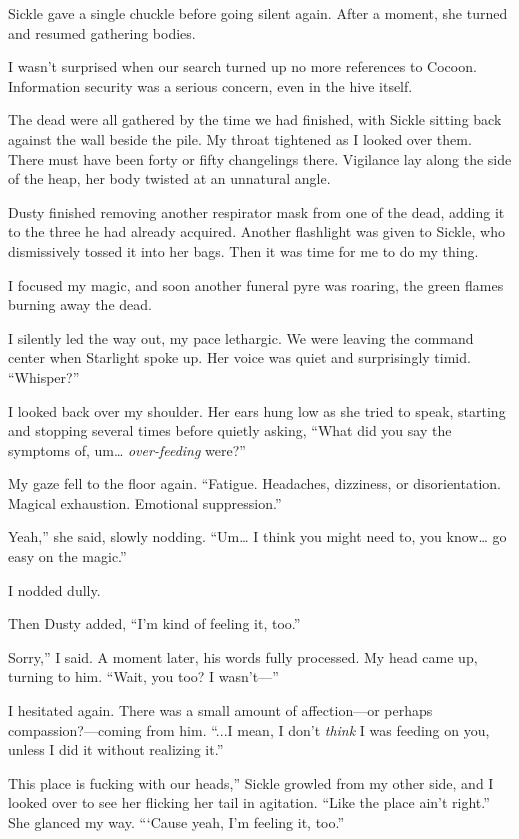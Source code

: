 Sickle gave a single chuckle before going silent again. After a moment, she turned and resumed gathering bodies.

I wasn’t surprised when our search turned up no more references to Cocoon. Information security was a serious concern, even in the hive itself.

The dead were all gathered by the time we had finished, with Sickle sitting back against the wall beside the pile. My throat tightened as I looked over them. There must have been forty or fifty changelings there. Vigilance lay along the side of the heap, her body twisted at an unnatural angle.

Dusty finished removing another respirator mask from one of the dead, adding it to the three he had already acquired. Another flashlight was given to Sickle, who dismissively tossed it into her bags. Then it was time for me to do my thing.

I focused my magic, and soon another funeral pyre was roaring, the green flames burning away the dead.

I silently led the way out, my pace lethargic. We were leaving the command center when Starlight spoke up. Her voice was quiet and surprisingly timid. “Whisper?”

I looked back over my shoulder. Her ears hung low as she tried to speak, starting and stopping several times before quietly asking, “What did you say the symptoms of, um… \textit{over-feeding} were?”

My gaze fell to the floor again. “Fatigue. Headaches, dizziness, or disorientation. Magical exhaustion. Emotional suppression.”

\leavevmode{}Yeah,” she said, slowly nodding. “Um… I think you might need to, you know… go easy on the magic.”

I nodded dully.

Then Dusty added, “I’m kind of feeling it, too.”

\leavevmode{}Sorry,” I said. A moment later, his words fully processed. My head came up, turning to him. “Wait, you too? I wasn’t—”

I hesitated again. There was a small amount of affection—or perhaps compassion?—coming from him. “...I mean, I don’t \textit{think} I was feeding on you, unless I did it without realizing it.”

\leavevmode{}This place is fucking with our heads,” Sickle growled from my other side, and I looked over to see her flicking her tail in agitation. “Like the place ain’t right.” She glanced my way. “‘Cause yeah, I’m feeling it, too.”

